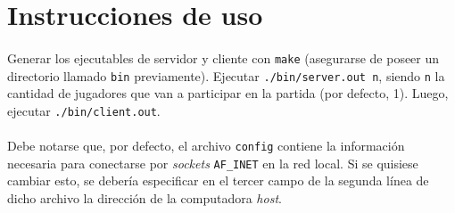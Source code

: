 \documentclass[spanish]{article}
\begin{document}
\section{Instrucciones de uso}
\paragraph{} Generar los ejecutables de servidor y cliente con \verb|make| (asegurarse de poseer un directorio llamado \verb|bin| previamente). Ejecutar \verb|./bin/server.out n|, siendo \verb|n| la cantidad de jugadores que van a participar en la partida (por defecto, 1). Luego, ejecutar \verb|./bin/client.out|. 
\paragraph{} Debe notarse que, por defecto, el archivo \verb|config| contiene la información necesaria para conectarse por \textit{sockets} \verb|AF_INET| en la red local. Si se quisiese cambiar esto, se debería especificar en el tercer campo de la segunda línea de dicho archivo la dirección de la computadora \textit{host}.
\end{document}
